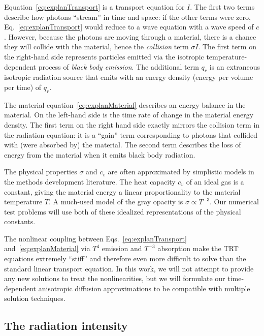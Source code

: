 Equation~\eqref{eq:explanTransport} is a transport equation for $I$. The first
two terms describe how photons ``stream'' in time and space: if the
other terms were zero, Eq.~\eqref{eq:explanTransport} would reduce to a
wave equation with a wave speed of $c$. However, because the photons are moving
through a material, there is a chance they will collide with the material,
hence the \emph{collision} term $\sigma I$. The first term on the right-hand
side represents particles emitted via the isotropic temperature-dependent
process of \emph{black body emission}. The additional term $q_r$ is an extraneous
isotropic radiation source that emits with an energy density (energy per
volume per time) of $q_r$.

The material equation~\eqref{eq:explanMaterial} describes an energy balance in
the material. On the left-hand side is the time rate of change in the material
energy density. The first term on the right hand side exactly mirrors the collision term in the
radiation equation: it is a ``gain'' term corresponding to photons that
collided with (were absorbed by) the material. The second term describes the loss
of energy from the material when it emits black body radiation.

The physical properties $\sigma$ and $c_v$ are often approximated by simplistic
models in the methods development literature. The heat capacity $c_v$ of an ideal
gas is a constant, giving the material energy a linear proportionality to
the material temperature $T$. A much-used model \cite{Mou2006,Wol2008} of the
gray opacity is $\sigma \propto T^{-3}$.
Our numerical test problems will use both of these idealized representations of
the physical constants.

The nonlinear coupling between Eqs.~\eqref{eq:explanTransport}
and~\eqref{eq:explanMaterial} via $T^4$ emission and $T^{-3}$ absorption make
the TRT equations extremely ``stiff'' \cite{Kno2003} and therefore even more
difficult to solve than the standard linear transport equation. In this work,
we will not attempt to provide any new solutions to treat the nonlinearities,
but we will formulate our time-dependent anisotropic diffusion approximations to
be compatible with multiple solution techniques.

\subsection{The radiation intensity}

